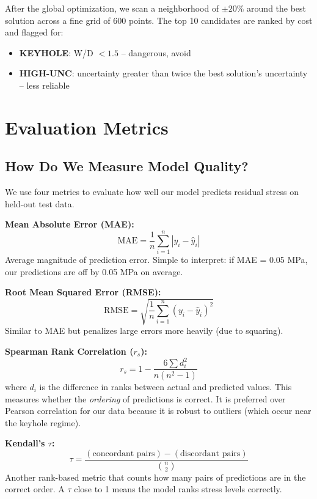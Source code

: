 \documentclass[12pt,a4paper]{report}
\begin{document}
After the global optimization, we scan a neighborhood of $\pm 20\%$ around the best solution across a fine grid of 600 points. The top 10 candidates are ranked by cost and flagged for:
\begin{itemize}
  \item \textbf{KEYHOLE}: W/D $< 1.5$ -- dangerous, avoid
  \item \textbf{HIGH-UNC}: uncertainty greater than twice the best solution's uncertainty -- less reliable
\end{itemize}

\chapter{Evaluation Metrics}

\section{How Do We Measure Model Quality?}

We use four metrics to evaluate how well our model predicts residual stress on held-out test data.

\textbf{Mean Absolute Error (MAE):}
\begin{equation}
\text{MAE} = \frac{1}{n}\sum_{i=1}^n |y_i - \hat{y}_i|
\end{equation}
Average magnitude of prediction error. Simple to interpret: if MAE = 0.05 MPa, our predictions are off by 0.05 MPa on average.

\textbf{Root Mean Squared Error (RMSE):}
\begin{equation}
\text{RMSE} = \sqrt{\frac{1}{n}\sum_{i=1}^n (y_i - \hat{y}_i)^2}
\end{equation}
Similar to MAE but penalizes large errors more heavily (due to squaring).

\textbf{Spearman Rank Correlation ($r_s$):}
\begin{equation}
r_s = 1 - \frac{6\sum d_i^2}{n(n^2-1)}
\end{equation}
where $d_i$ is the difference in ranks between actual and predicted values. This measures whether the \textit{ordering} of predictions is correct. It is preferred over Pearson correlation for our data because it is robust to outliers (which occur near the keyhole regime).

\textbf{Kendall's $\tau$:}
\begin{equation}
\tau = \frac{(\text{concordant pairs}) - (\text{discordant pairs})}{\binom{n}{2}}
\end{equation}
Another rank-based metric that counts how many pairs of predictions are in the correct order. A $\tau$ close to 1 means the model ranks stress levels correctly.
\end{document}
